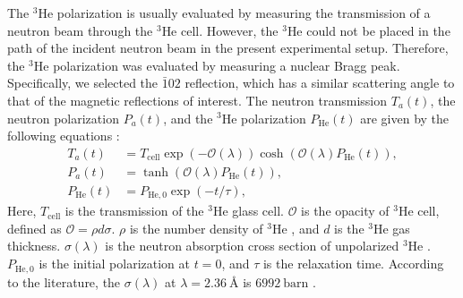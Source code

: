 \documentclass[%
 reprint,
superscriptaddress,
 amsmath,amssymb,
 aps,
floatfix,
]{revtex4-2}
\newcommand{\He}{$^3$He }
\begin{document}
    \label{sec:He-3}
    The \He polarization is usually evaluated by measuring the transmission of a neutron beam through the \He cell.
    However, the \He could not be placed in the path of the incident neutron beam in the present experimental setup.
    Therefore, the \He polarization was evaluated by measuring a nuclear Bragg peak. %
    Specifically, we selected the $\bar{1}02$ reflection, which has a similar scattering angle to that of the magnetic reflections of interest.
    The neutron transmission $T_a(t)$, the neutron polarization $P_a(t)$, and the \He polarization $P_\mathrm{He}(t)$ are given by the following equations \cite{coulter_neutron_1990}:
    \begin{align}
        T_a(t) &= T_\mathrm{cell}\exp(-\mathcal{O}(\lambda))\cosh(\mathcal{O}(\lambda)P_\mathrm{He}(t)),
        \label{eq:transmission_3He}\\
        P_a(t) &= \tanh(\mathcal{O}(\lambda)P_\mathrm{He}(t)),
        \label{eq:pol_n3He}\\
        P_\mathrm{He}(t) &= P_\mathrm{He,0} \exp(-t/\tau),
        \label{eq:pol_3He}
    \end{align}
    Here, $T_\mathrm{cell}$ is the transmission of the \He glass cell.
    $\mathcal{O}$ is the opacity of \He cell, defined as $\mathcal{O} = \rho d \sigma$.
    $\rho$ is the number density of \He, and $d$ is the \He gas thickness.
    $\sigma(\lambda)$ is the neutron absorption cross section of unpolarized \He.
    $P_{\mathrm{He},0}$ is the initial polarization at $t=0$, and $\tau$ is the relaxation time.
    According to the literature, the $\sigma(\lambda)$ at $\lambda = 2.36\ \textrm{\AA}$ is $6992~\textrm{barn}$ \cite{passell_measurement_1966}.
\end{document}
